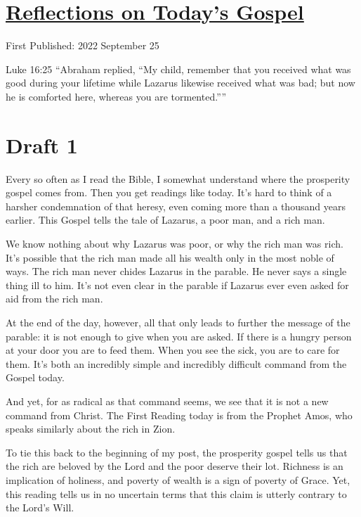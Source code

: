 \documentclass[12pt]{article}[titlepage]
\newcommand{\say}[1]{``#1''}
\newcommand{\1}{\={a}}
\newcommand{\2}{\={e}}
\newcommand{\3}{\={\i}}
\newcommand{\4}{\=o}
\newcommand{\5}{\=u}
\newcommand{\6}{\={A}}
\renewcommand{\,}{\textsuperscript{,}}
\begin{document}
\doublespacing
\section{\href{reflections-on-readings-26-ordinary-c-22.html}{Reflections on Today's Gospel}}
First Published: 2022 September 25

Luke 16:25 \say{Abraham replied, \say{My child, remember that you received what was good during your lifetime while Lazarus likewise received what was bad; but now he is comforted here, whereas you are tormented.}}

\section{Draft 1}
Every so often as I read the Bible, I somewhat understand where the prosperity gospel comes from.
Then you get readings like today.
It's hard to think of a harsher condemnation of that heresy, even coming more than a thousand years earlier.
This Gospel tells the tale of Lazarus, a poor man, and a rich man.

We know nothing about why Lazarus was poor, or why the rich man was rich.
It's possible that the rich man made all his wealth only in the most noble of ways.
The rich man never chides Lazarus in the parable.
He never says a single thing ill to him.
It's not even clear in the parable if Lazarus ever even asked for aid from the rich man.

At the end of the day, however, all that only leads to further the message of the parable: it is not enough to give when you are asked.
If there is a hungry person at your door you are to feed them.
When you see the sick, you are to care for them.
It's both an incredibly simple and incredibly difficult command from the Gospel today.

And yet, for as radical as that command seems, we see that it is not a new command from Christ.
The First Reading today is from the Prophet Amos, who speaks similarly about the rich in Zion.

To tie this back to the beginning of my post, the prosperity gospel tells us that the rich are beloved by the Lord and the poor deserve their lot.
Richness is an implication of holiness, and poverty of wealth is a sign of poverty of Grace.
Yet, this reading tells us in no uncertain terms that this claim is utterly contrary to the Lord's Will.
\end{document}
